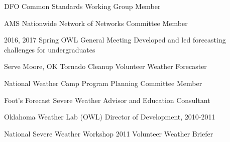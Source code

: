 \begin{cvskills}
  \cvskill
    {DFO Common Standards Working Group} %
    {Member} %

  \cvskill
    {AMS Nationwide Network of Networks Committee} %
    {Member} %

  \cvskill
    {2016, 2017 Spring OWL General Meeting} %
    {Developed and led forecasting challenges for undergraduates} %

  \cvskill
    {Serve Moore, OK Tornado Cleanup} %
    {Volunteer Weather Forecaster} %

  \cvskill
    {National Weather Camp Program Planning Committee} %
    {Member} %
    
  \cvskill
    {Foot's Forecast} %
    {Severe Weather Advisor and Education Consultant} %
    
  \cvskill
    {Oklahoma Weather Lab (OWL)}
    {Director of Development, 2010-2011}
    
  \cvskill
    {National Severe Weather Workshop 2011} %
    {Volunteer Weather Briefer} %
\end{cvskills}
